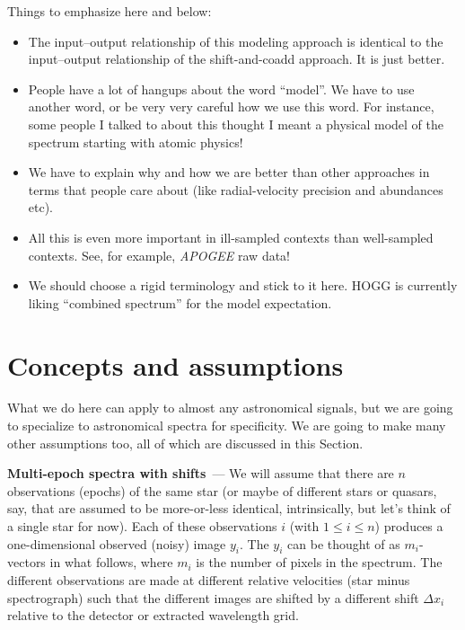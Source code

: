 \documentclass[11pt]{article}
\renewcommand{\paragraph}[1]{\medskip\par\noindent\textbf{#1}~---}
\newcommand{\sectionname}{Section}
\begin{document}
Things to emphasize here and below:
\begin{itemize}
\item The input--output relationship of this modeling approach is identical to the input--output relationship of the shift-and-coadd approach. It is just better.
\item People have a lot of hangups about the word ``model''. We have to use another word, or be very very careful how we use this word. For instance, some people I talked to about this thought I meant a physical model of the spectrum starting with atomic physics!
\item We have to explain why and how we are better than other approaches in terms that people care about (like radial-velocity precision and abundances etc).
\item All this is even more important in ill-sampled contexts than well-sampled contexts. See, for example, \textsl{APOGEE} raw data!
\item We should choose a rigid terminology and stick to it here. HOGG is currently liking ``combined spectrum'' for the model expectation.
\end{itemize}

\section{Concepts and assumptions}

What we do here can apply to almost any astronomical signals, but we are going to specialize to astronomical spectra for specificity.
We are going to make many other assumptions too, all of which are discussed in this \sectionname.

\paragraph{Multi-epoch spectra with shifts}
We will assume that there are $n$ observations (epochs) of the same star (or maybe of different stars or quasars, say, that are assumed to be more-or-less identical, intrinsically, but let's think of a single star for now).
Each of these observations $i$ (with $1\leq i\leq n$) produces a one-dimensional observed (noisy) image $y_i$.
The $y_i$ can be thought of as $m_i$-vectors in what follows, where $m_i$ is the number of pixels in the spectrum.
The different observations are made at different relative velocities (star minus spectrograph) such that the different images are shifted by a different shift $\Delta x_i$ relative to the detector or extracted wavelength grid.
\end{document}
